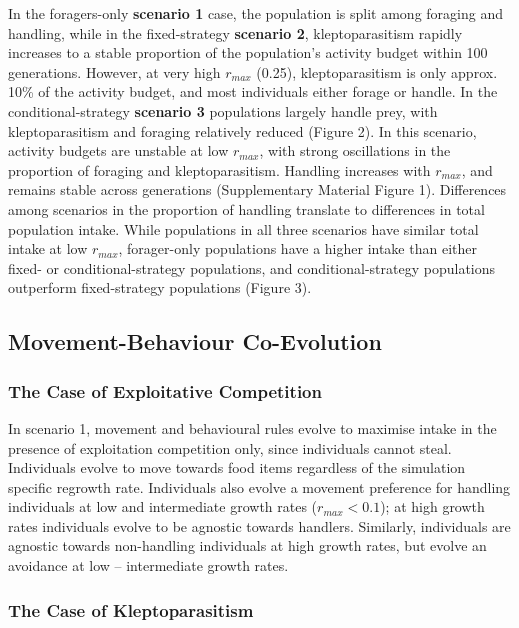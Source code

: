 \documentclass[11pt]{article}
\begin{document}
In the foragers-only \textbf{scenario 1} case, the population is split among foraging and handling, while in the fixed-strategy \textbf{scenario 2}, kleptoparasitism rapidly increases to a stable proportion of the population's activity budget within 100 generations.
However, at very high $r_{max}$ (0.25), kleptoparasitism is only approx. 10\% of the activity budget, and most individuals either forage or handle.
In the conditional-strategy \textbf{scenario 3} populations largely handle prey, with kleptoparasitism and foraging relatively reduced (Figure 2).
In this scenario, activity budgets are unstable at low $r_{max}$, with strong oscillations in the proportion of foraging and kleptoparasitism.
Handling increases with $r_{max}$, and remains stable across generations (Supplementary Material Figure 1).
Differences among scenarios in the proportion of handling translate to differences in total population intake.
While populations in all three scenarios have similar total intake at low $r_{max}$, forager-only populations have a higher intake than either fixed- or conditional-strategy populations, and conditional-strategy populations outperform fixed-strategy populations (Figure 3).

\subsection{Movement-Behaviour Co-Evolution}

\subsubsection{The Case of Exploitative Competition}

In scenario 1, movement and behavioural rules evolve to maximise intake in the presence of exploitation competition only, since individuals cannot steal.
Individuals evolve to move towards food items regardless of the simulation specific regrowth rate.
Individuals also evolve a movement preference for handling individuals at low and intermediate growth rates ($r_{max} < 0.1$); at high growth rates individuals evolve to be agnostic towards handlers.
Similarly, individuals are agnostic towards non-handling individuals at high growth rates, but evolve an avoidance at low -- intermediate growth rates.

\subsubsection{The Case of Kleptoparasitism}
\end{document}
